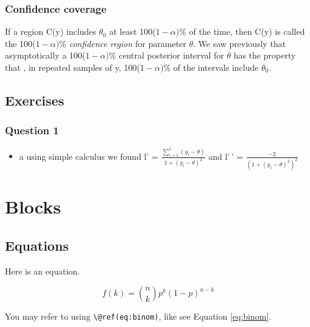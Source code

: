 \documentclass[
]{book}
\providecommand{\tightlist}{%
  \setlength{\itemsep}{0pt}\setlength{\parskip}{0pt}}
\theoremstyle{definition}
\theoremstyle{definition}
\theoremstyle{definition}
\theoremstyle{definition}
\theoremstyle{remark}
\begin{document}
\hypertarget{confidence-coverage}{%
\subsection*{Confidence coverage}\label{confidence-coverage}}

If a region C(y) includes \(\theta_0\) at least 100(\(1-\alpha)\%\) of the time, then C(y) is called the 100(\(1-\alpha)\%\) \emph{confidence region} for parameter \(\theta\). We saw previously that asymptotically a 100(\(1-\alpha)\%\) central posterior interval for \(\theta\) has the property that , in repeated samples of y, 100(\(1-\alpha)\%\) of the intervals include \(\theta_0\).

\hypertarget{exercises-3}{%
\section{Exercises}\label{exercises-3}}

\hypertarget{question-1-2}{%
\subsection*{Question 1}\label{question-1-2}}

\begin{itemize}
\tightlist
\item
  a using simple calculus we found l' = \(\frac{\sum_{i=1}^5(y_i-\theta)}{1+(y_i-\theta)^2}\) and l'\,' = \(\frac{-2}{(1+(y_i-\theta)^2)^2}\)
\end{itemize}

\hypertarget{blocks}{%
\chapter{Blocks}\label{blocks}}

\hypertarget{equations}{%
\section{Equations}\label{equations}}

Here is an equation.

\begin{equation} 
  f\left(k\right) = \binom{n}{k} p^k\left(1-p\right)^{n-k}
  \label{eq:binom}
\end{equation}

You may refer to using \texttt{\textbackslash{}@ref(eq:binom)}, like see Equation \eqref{eq:binom}.
\end{document}
